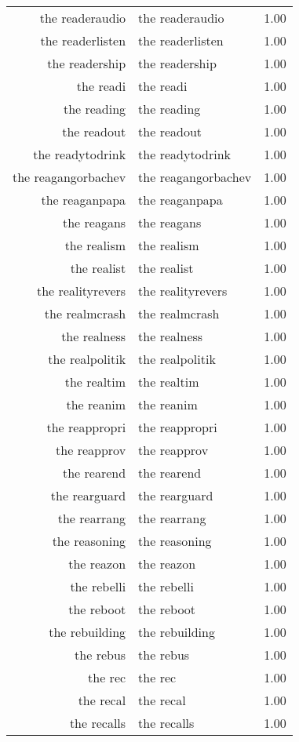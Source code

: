 \begin{table}[ht]
\begin{tabular}{rlr}
  the readeraudio & the readeraudio & 1.00 \\ 
  the readerlisten & the readerlisten & 1.00 \\ 
  the readership & the readership & 1.00 \\ 
  the readi & the readi & 1.00 \\ 
  the reading & the reading & 1.00 \\ 
  the readout & the readout & 1.00 \\ 
  the readytodrink & the readytodrink & 1.00 \\ 
  the reagangorbachev & the reagangorbachev & 1.00 \\ 
  the reaganpapa & the reaganpapa & 1.00 \\ 
  the reagans & the reagans & 1.00 \\ 
  the realism & the realism & 1.00 \\ 
  the realist & the realist & 1.00 \\ 
  the realityrevers & the realityrevers & 1.00 \\ 
  the realmcrash & the realmcrash & 1.00 \\ 
  the realness & the realness & 1.00 \\ 
  the realpolitik & the realpolitik & 1.00 \\ 
  the realtim & the realtim & 1.00 \\ 
  the reanim & the reanim & 1.00 \\ 
  the reappropri & the reappropri & 1.00 \\ 
  the reapprov & the reapprov & 1.00 \\ 
  the rearend & the rearend & 1.00 \\ 
  the rearguard & the rearguard & 1.00 \\ 
  the rearrang & the rearrang & 1.00 \\ 
  the reasoning & the reasoning & 1.00 \\ 
  the reazon & the reazon & 1.00 \\ 
  the rebelli & the rebelli & 1.00 \\ 
  the reboot & the reboot & 1.00 \\ 
  the rebuilding & the rebuilding & 1.00 \\ 
  the rebus & the rebus & 1.00 \\ 
  the rec & the rec & 1.00 \\ 
  the recal & the recal & 1.00 \\ 
  the recalls & the recalls & 1.00 \\ 

\end{tabular}
\end{table}
